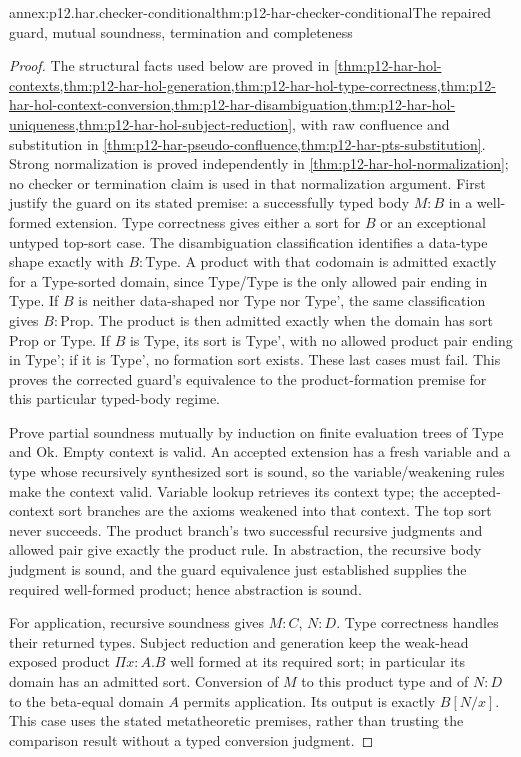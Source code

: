 \begin{annexitem}{annex:p12.har.checker-conditional}{thm:p12-har-checker-conditional}{The repaired guard, mutual soundness, termination and completeness}
\begin{proof}
The structural facts used below are proved in
\cref{thm:p12-har-hol-contexts,thm:p12-har-hol-generation,thm:p12-har-hol-type-correctness,thm:p12-har-hol-context-conversion,thm:p12-har-disambiguation,thm:p12-har-hol-uniqueness,thm:p12-har-hol-subject-reduction},
with raw confluence and substitution in
\cref{thm:p12-har-pseudo-confluence,thm:p12-har-pts-substitution}.
Strong normalization is proved independently in
\cref{thm:p12-har-hol-normalization}; no checker or termination
claim is used in that normalization argument.
First justify the guard on its stated premise: a successfully typed
body \(M:B\) in a well-formed extension. Type correctness gives
either a sort for \(B\) or an exceptional untyped top-sort case.
The disambiguation classification identifies a data-type shape exactly
with \(B:\mathrm{Type}\). A product with that codomain is
admitted exactly for a Type-sorted domain, since Type/Type is the only
allowed pair ending in Type. If \(B\) is neither data-shaped nor
Type nor Type', the same classification gives \(B:\mathrm{Prop}\).
The product is then admitted exactly when the domain has sort Prop or
Type. If \(B\) is Type, its sort is Type', with no allowed product
pair ending in Type'; if it is Type', no formation sort exists. These
last cases must fail. This proves the corrected guard's equivalence to
the product-formation premise for this particular typed-body regime.

Prove partial soundness mutually by induction on finite evaluation
trees of Type and Ok. Empty context is valid. An accepted extension has
a fresh variable and a type whose recursively synthesized sort is
sound, so the variable/weakening rules make the context valid. Variable
lookup retrieves its context type; the accepted-context sort branches
are the axioms weakened into that context. The top sort never succeeds.
The product branch's two successful recursive judgments and allowed
pair give exactly the product rule. In abstraction, the recursive body
judgment is sound, and the guard equivalence just established supplies
the required well-formed product; hence abstraction is sound.

For application, recursive soundness gives \(M:C\), \(N:D\).
Type correctness handles their returned types. Subject reduction and
generation keep the weak-head exposed product \(\Pi x:A.B\)
well formed at its required sort; in particular its domain has an
admitted sort. Conversion of \(M\) to this product type and of
\(N:D\) to the beta-equal domain \(A\) permits application.
Its output is exactly \(B[N/x]\). This case uses the stated
metatheoretic premises, rather than trusting the comparison result
without a typed conversion judgment.


\end{proof}
\end{annexitem}
